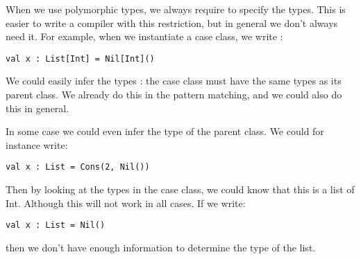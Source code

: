 When we use polymorphic types, we always require to specify the types. This is easier to write a compiler with this restriction, but in general we don't always need it. For example, when we instantiate a case class, we write :
\begin{lstlisting}
val x : List[Int] = Nil[Int]()
\end{lstlisting}
We could easily infer the types : the case class must have the same types as its parent class. We already do this in the pattern matching, and we could also do this in general.

In some case we could even infer the type of the parent class. We could for instance write:
\begin{lstlisting}
val x : List = Cons(2, Nil())
\end{lstlisting}
Then by looking at the types in the case class, we could know that this is a list of Int. Although this will not work in all cases. If we write: 
\begin{lstlisting}
val x : List = Nil()
\end{lstlisting}
then we don't have enough information to determine the type of the list.

